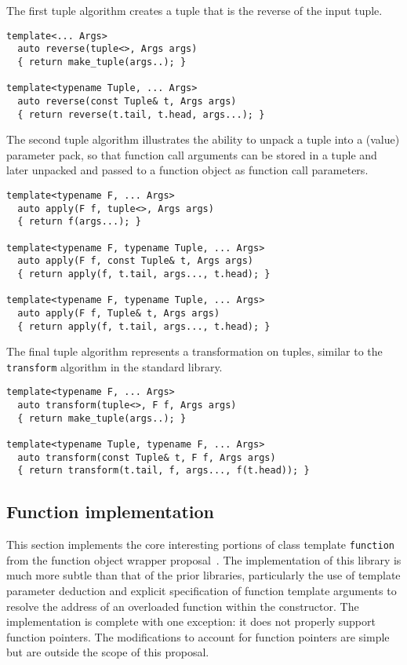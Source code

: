 \documentclass{article}
\begin{document}
The first tuple algorithm creates a tuple that is the reverse of the
input tuple.
\begin{verbatim}
template<... Args>
  auto reverse(tuple<>, Args args)
  { return make_tuple(args..); }

template<typename Tuple, ... Args>
  auto reverse(const Tuple& t, Args args)
  { return reverse(t.tail, t.head, args...); }
\end{verbatim}

The second tuple algorithm illustrates the ability to unpack a tuple
into a (value) parameter pack, so that function call arguments can be
stored in a tuple and later unpacked and passed to a function object
as function call parameters.
\begin{verbatim}
template<typename F, ... Args>
  auto apply(F f, tuple<>, Args args)
  { return f(args...); }

template<typename F, typename Tuple, ... Args>
  auto apply(F f, const Tuple& t, Args args)
  { return apply(f, t.tail, args..., t.head); }

template<typename F, typename Tuple, ... Args>
  auto apply(F f, Tuple& t, Args args)
  { return apply(f, t.tail, args..., t.head); }
\end{verbatim}

The final tuple algorithm represents a transformation on tuples,
similar to the {\tt transform} algorithm in the standard library.
\begin{verbatim}
template<typename F, ... Args>
  auto transform(tuple<>, F f, Args args)
  { return make_tuple(args..); }

template<typename Tuple, typename F, ... Args>
  auto transform(const Tuple& t, F f, Args args)
  { return transform(t.tail, f, args..., f(t.head)); }
\end{verbatim}

\subsection{Function implementation}
\label{functionimpl}
This section implements the core interesting portions of class
template {\tt function} from the function object wrapper
proposal~\cite{Gregor02}. The implementation of this library is much
more subtle than that of the prior libraries, particularly the use of
template parameter deduction and explicit specification of function
template arguments to resolve the address of an overloaded function
within the constructor. The implementation is complete with one
exception: it does not properly support function pointers. The
modifications to account for function pointers are simple but are
outside the scope of this proposal.
\end{document}

